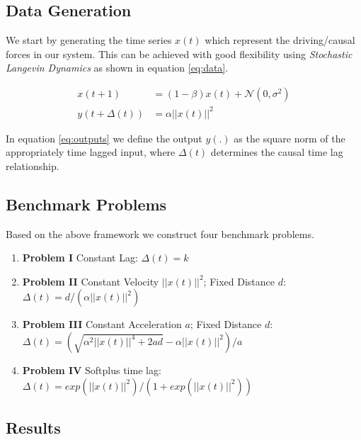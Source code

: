 \documentclass[twoside]{article}
\begin{document}
\subsection{Data Generation}

We start by generating the time series $x(t)$ which represent the driving/causal forces in our system. This can be achieved with good flexibility using \emph{Stochastic Langevin Dynamics} as shown in equation \ref{eq:data}. 

\begin{align}
 x(t+1) &= (1 - \beta) x(t) + \mathcal{N}(0, \sigma^2) \label{eq:data}\\
 y(t+\Delta(t)) &= \alpha ||x(t)||^2 \label{eq:outputs}
\end{align}

In equation \ref{eq:outputs} we define the output $y(.)$ as the square norm
of the appropriately time lagged input, where $\Delta(t)$ determines the causal
time lag relationship.

\subsection{Benchmark Problems}\label{sec:benchmark}

Based on the above framework we construct four benchmark problems.

\begin{enumerate}
\item \textbf{Problem I} Constant Lag: \newline 
$\Delta(t) = k$

\item \textbf{Problem II} Constant Velocity $||x(t)||^2$; Fixed Distance $d$: 
\newline $\Delta(t) = d/(\alpha ||x(t)||^2)$

\item \textbf{Problem III} Constant Acceleration $a$; Fixed Distance $d$: 
\newline $\Delta(t) = (\sqrt{\alpha^2||x(t)||^4 + 2ad} - \alpha||x(t)||^2)/a$

\item \textbf{Problem IV} Softplus time lag: 
\newline $\Delta(t) = exp\left(||x(t)||^2\right)/\left(1 + exp(||x(t)||^2)\right)$

\end{enumerate}

\subsection{Results}
\end{document}
